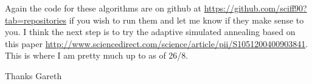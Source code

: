 \documentclass[12pt]{article}
\begin{document}
Again the code for these algorithms are on github at \url{https://github.com/sciff90?tab=repositories} if you wish to run them and let me know if they make sense to you. I think the next step is to try the adaptive simulated annealing based on this paper \url{http://www.sciencedirect.com/science/article/pii/S1051200400903841}. This is where I am pretty much up to as of 26/8.

Thanks Gareth
\end{document}
